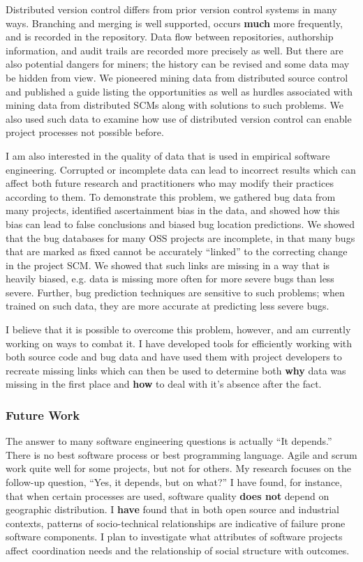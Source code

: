 \documentclass[10pt]{article}
\newcommand\Section[1]{\subsubsection*{\large #1}}
\begin{document}
\begin{small}
Distributed version control differs from prior version control systems in many
ways.  Branching and merging is well supported, occurs \textbf{much} more
frequently, and is recorded in the repository.  Data flow between repositories,
authorship information, and audit trails are recorded more precisely as well.
But there are also potential dangers for miners; the history can be revised and
some data may be hidden from view.  We pioneered mining data from distributed
source control and published a guide listing the opportunities as well as
hurdles associated with mining data from distributed SCMs along with solutions
to such problems.  We also used such data to examine how use of distributed version 
control can enable project processes not possible before.

I am also interested in the quality of data that is used in empirical software
engineering.  Corrupted or incomplete data can lead to incorrect results which
can affect both future research and practitioners who may modify their
practices according to them.  To demonstrate this problem, we gathered bug data
from many projects, identified ascertainment bias in the data, and showed how
this bias can lead to false conclusions and biased bug location predictions.
We showed that the bug databases for many OSS projects are incomplete, in that
many bugs that are marked as fixed cannot be accurately ``linked'' to the
correcting change in the project SCM.  We showed that such links are missing in
a way that is heavily biased, e.g. data is missing more often for more severe
bugs than less severe. Further, bug prediction techniques are sensitive
to such problems; when trained on such data, they are more accurate at predicting
less severe bugs.

I believe that it is possible to overcome this problem, however, and am
currently working on ways to combat it.  I have developed tools for efficiently
working with both source code and bug data and have used them with project
developers to recreate missing links which can then be used to determine both
\textbf{why} data was missing in the first place and \textbf{how} to deal with
it's absence after the fact.

\Section{Future Work}

The answer to many software engineering questions is actually ``It depends.''
There is no best software process or best programming language.  Agile and
scrum work quite well for some projects, but not for others.  My research
focuses on the follow-up question, ``Yes, it depends, but on what?'' I have
found, for instance, that when certain processes are used, software quality
\textbf{does not} depend on geographic distribution.  I \textbf{have} found
that in both open source and industrial contexts, patterns of socio-technical
relationships are indicative of failure prone software components.  I plan to
investigate what attributes of software projects affect coordination needs and
the relationship of social structure with outcomes.


\end{small}
\end{document}
